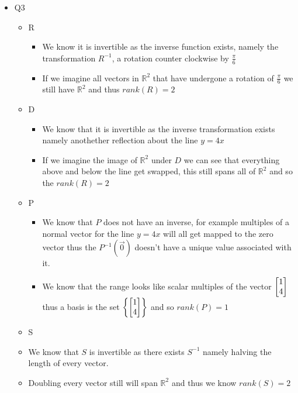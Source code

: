 \documentclass[11pt]{book}
\begin{document}
\begin{itemize}
\begin{itemize}
        \end{itemize}
    \item Q3
        \begin{itemize}
            \item R
                \begin{itemize}
                    \item We know it is invertible as the inverse function exists, namely the transformation $R^{-1} $, a rotation counter clockwise by $\frac{\pi }{6}$ 
                    \item If we imagine all vectors in $\mathbb{R}^2 $ that have undergone a rotation of $\frac{\pi }{6} $ we still have $\mathbb{R}^2 $ and thus $\mathit{rank} \left(R\right) = 2$ 
                \end{itemize}
            \item D
                \begin{itemize}
                    \item We know that it is invertible as the inverse transformation exists namely anothether reflection about the line $y= 4x$ 
                    \item If we imagine the image of $\mathbb{R}^2 $ under $D$ we can see that everything above and below the line get swapped, this still spans all of $\mathbb{R}^2 $ and so the $\mathit{rank} \left(R\right) = 2$ 
                \end{itemize}
            \item P
                \begin{itemize}
                    \item We know that $P$ does not have an inverse, for example multiples of a normal vector for the line $y= 4x$ will all get mapped to the zero vector thus the $P^{-1} \left(\vec{0}\right)$ doesn't have a unique value associated with it. 
                    \item We know that the range looks like scalar multiples of the vector $\begin{bmatrix} 1 \\ 4 \end{bmatrix} $ thus a basis is the set $\left\{ \begin{bmatrix} 1 \\ 4 \end{bmatrix}  \right\} $ and so $\mathit{rank} \left(  P\right) = 1 $ 
                \end{itemize}
            \item S
                \item We know that $S$ is invertible as there exists $S^{-1} $ namely halving the length of every vector.
                \item Doubling every vector still will span $\mathbb{R}^2 $ and thus we know $\mathit{rank} \left(S\right) = 2$  

\end{itemize}
\end{itemize}
\end{document}
